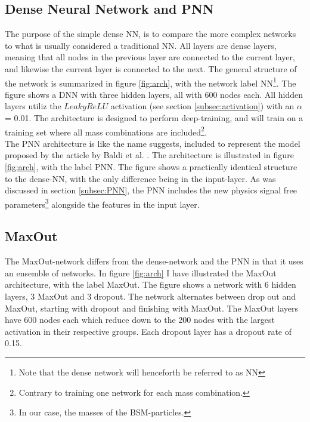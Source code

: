 \subsection*{Dense Neural Network and PNN}
The purpose of the simple dense \ac{NN}, is to compare the more complex networks to what is usually considered a traditional \ac{NN}.
All layers are dense layers, meaning that all nodes in the previous layer are connected to the current layer, and likewise
the current layer is connected to the next. The general structure of the network is summarized in figure \ref{fig:arch}, with 
the network label \ac{NN}\footnote{Note that the dense network will henceforth be referred to as \ac{NN}}. The figure shows a \ac{DNN} with 
three hidden layers, all with 600 nodes each. All hidden layers utiliz the $LeakyReLU$ activation (see section \ref{subsec:activation})
with an $\alpha$ = 0.01. The architecture is designed to perform deep-training, and will train on a training set where all mass combinations 
are included\footnote{Contrary to training one network for each mass combination.}. 
\\
The \ac{PNN} architecture is like the name suggests, included to represent the model proposed by the article by Baldi et al. \cite{PNN}.
The architecture is illustrated in figure \ref{fig:arch}, with the label PNN. The figure shows a practically identical 
structure to the dense-\ac{NN}, with the only difference being in the input-layer. As was discussed in section \ref{subsec:PNN},
the \ac{PNN} includes the new physics signal free parameters\footnote{In our case, the masses of the \ac{BSM}-particles.} alongside the features
in the input layer.
\subsection*{MaxOut}
The MaxOut-network differs from the dense-network and the \ac{PNN} in that it uses an ensemble of networks. In figure \ref{fig:arch}
I have illustrated the MaxOut architecture, with the label MaxOut. The figure shows a network with 6 hidden layers, 3 MaxOut and 3 dropout.
The network alternates between drop out and MaxOut, starting with dropout and finishing with MaxOut. The MaxOut layers have 600 nodes each 
which reduce down to the 200 nodes with the largest activation in their respective groups. Each dropout layer has a dropout rate of 0.15.
  
 

